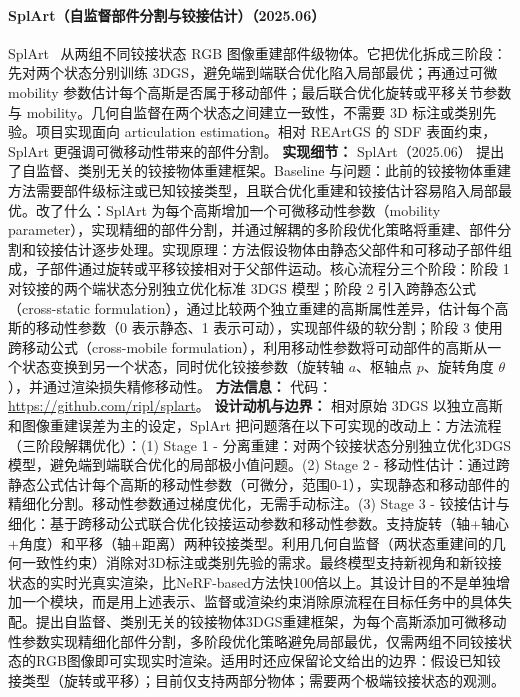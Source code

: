 \paragraph{SplArt（自监督部件分割与铰接估计）（2025.06）}
SplArt~\cite{2506_03594} 从两组不同铰接状态 RGB 图像重建部件级物体。它把优化拆成三阶段：先对两个状态分别训练 3DGS，避免端到端联合优化陷入局部最优；再通过可微 mobility 参数估计每个高斯是否属于移动部件；最后联合优化旋转或平移关节参数与 mobility。几何自监督在两个状态之间建立一致性，不需要 3D 标注或类别先验。项目实现面向 articulation estimation。相对 REArtGS 的 SDF 表面约束，SplArt 更强调可微移动性带来的部件分割。
\textbf{实现细节：} SplArt（2025.06） 提出了自监督、类别无关的铰接物体重建框架。Baseline 与问题：此前的铰接物体重建方法需要部件级标注或已知铰接类型，且联合优化重建和铰接估计容易陷入局部最优。改了什么：SplArt 为每个高斯增加一个可微移动性参数（mobility parameter），实现精细的部件分割，并通过解耦的多阶段优化策略将重建、部件分割和铰接估计逐步处理。实现原理：方法假设物体由静态父部件和可移动子部件组成，子部件通过旋转或平移铰接相对于父部件运动。核心流程分三个阶段：阶段 1 对铰接的两个端状态分别独立优化标准 3DGS 模型；阶段 2 引入跨静态公式（cross-static formulation），通过比较两个独立重建的高斯属性差异，估计每个高斯的移动性参数（0 表示静态、1 表示可动），实现部件级的软分割；阶段 3 使用跨移动公式（cross-mobile formulation），利用移动性参数将可动部件的高斯从一个状态变换到另一个状态，同时优化铰接参数（旋转轴 $a$、枢轴点 $p$、旋转角度 $\theta$），并通过渲染损失精修移动性。
\textbf{方法信息：} 代码：\url{https://github.com/ripl/splart}。
\textbf{设计动机与边界：} 相对原始 3DGS 以独立高斯和图像重建误差为主的设定，SplArt 把问题落在以下可实现的改动上：方法流程（三阶段解耦优化）：(1) Stage 1 - 分离重建：对两个铰接状态分别独立优化3DGS模型，避免端到端联合优化的局部极小值问题。(2) Stage 2 - 移动性估计：通过跨静态公式估计每个高斯的移动性参数（可微分，范围0-1），实现静态和移动部件的精细化分割。移动性参数通过梯度优化，无需手动标注。(3) Stage 3 - 铰接估计与细化：基于跨移动公式联合优化铰接运动参数和移动性参数。支持旋转（轴+轴心+角度）和平移（轴+距离）两种铰接类型。利用几何自监督（两状态重建间的几何一致性约束）消除对3D标注或类别先验的需求。最终模型支持新视角和新铰接状态的实时光真实渲染，比NeRF-based方法快100倍以上。其设计目的不是单独增加一个模块，而是用上述表示、监督或渲染约束消除原流程在目标任务中的具体失配。提出自监督、类别无关的铰接物体3DGS重建框架，为每个高斯添加可微移动性参数实现精细化部件分割，多阶段优化策略避免局部最优，仅需两组不同铰接状态的RGB图像即可实现实时渲染。适用时还应保留论文给出的边界：假设已知铰接类型（旋转或平移）；目前仅支持两部分物体；需要两个极端铰接状态的观测。
